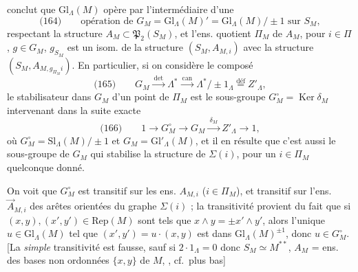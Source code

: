 \documentclass[11pt,a4paper]{article}
\begin{document}
conclut que $\mathrm{Gl}_\Lambda(M)$ opère par l'intermédiaire d'une 
\[
\text{(164)}\qquad \text{opération de } G_M = \mathrm{Gl}_\Lambda(M)' = \mathrm{Gl}_\Lambda(M)/\pm 1 \text{ sur } S_M,
\]
respectant la structure $A_M\subset\mathfrak{P}_2(S_M)$, et l'ens. quotient $\Pi_M$ de $A_M$,  pour $i\in\Pi$, $g\in G_M$, $g_{S_M}$ est un isom. de la structure $(S_M,A_{M,i})$ avec la structure $(S_M, A_{M,g_{\Pi_M} i})$. En particulier, si on \struck{\ill{}} considère le composé
\[
\text{(165)}\qquad
G_M \xrightarrow{\ \det\ } \Lambda^{*} \xrightarrow{\ \mathrm{can}\ } \Lambda^{*}/\pm 1_\Lambda \overset{\mathrm{déf}}{=} Z'_\Lambda ,
\]
le stabilisateur dans $G_M$  d'un point de $\Pi_M$  est le sous-groupe $G^{\circ}_M = \operatorname{Ker}\delta_M$ intervenant dans la suite exacte
\[
\text{(166)}\qquad
1 \longrightarrow G^{\circ}_M \longrightarrow G_M \xrightarrow{\ \delta_M\ } Z'_\Lambda \longrightarrow 1 ,
\]
où $G^{\circ}_M = \mathrm{Sl}_\Lambda(M)/\pm 1$ et $G_M = \mathrm{Gl}'_\Lambda(M)$,
et il en résulte que c'est aussi le sous-groupe de $G_M$ qui stabilise la structure de  $\Sigma(i)$, pour un $i\in\Pi_M$ quelconque donné.

On voit que $G^{\circ}_M$ est transitif sur  les ens. $A_{M,i}$ ($i\in\Pi_M$), et  transitif sur l'ens. $\overrightarrow{A}_{M,i}$ des arêtes orientées du graphe  $\Sigma(i)$ ; la transitivité provient du fait que si $(x,y),(x',y')\in\mathrm{Rep}(M)$ sont tels que $x\wedge y=\pm x'\wedge y'$, alors l'unique $u\in\mathrm{Gl}_\Lambda(M)$ tel que $(x',y')=u\cdot(x,y)$ est dans $\mathrm{Gl}_\Lambda(M)^{\pm1}$, donc $u\in G^{\circ}_M$. [La \emph{simple} transitivité est fausse, sauf si $2\cdot1_\Lambda=0$ donc $S_M\simeq M^{**}$, $A_M$ = ens. des bases non ordonnées $\{x,y\}$ de $M$, \struck{\ill{}}, cf.\ plus bas] 
\end{document}
